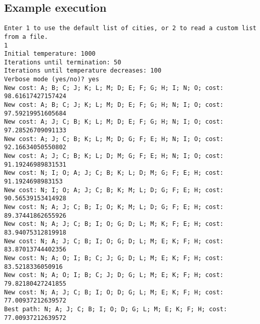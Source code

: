\documentclass[a4paper]{article}
\begin{document}
\subsection*{Example execution}
\begin{verbatim}
Enter 1 to use the default list of cities, or 2 to read a custom list from a file.
1
Initial temperature: 1000
Iterations until termination: 50
Iterations until temperature decreases: 100
Verbose mode (yes/no)? yes
New cost: A; B; C; J; K; L; M; D; E; F; G; H; I; N; O; cost: 98.61617427157424
New cost: A; B; C; J; K; L; M; D; E; F; G; H; N; I; O; cost: 97.59219951605684
New cost: A; J; C; B; K; L; M; D; E; F; G; H; N; I; O; cost: 97.28526709091133
New cost: A; J; C; B; K; L; M; D; G; F; E; H; N; I; O; cost: 92.16634050550802
New cost: A; J; C; B; K; L; D; M; G; F; E; H; N; I; O; cost: 91.19246989831531
New cost: N; I; O; A; J; C; B; K; L; D; M; G; F; E; H; cost: 91.1924698983153
New cost: N; I; O; A; J; C; B; K; M; L; D; G; F; E; H; cost: 90.56539153414928
New cost: N; A; J; C; B; I; O; K; M; L; D; G; F; E; H; cost: 89.37441862655926
New cost: N; A; J; C; B; I; O; G; D; L; M; K; F; E; H; cost: 83.94075312819918
New cost: N; A; J; C; B; I; O; G; D; L; M; E; K; F; H; cost: 83.87013744402356
New cost: N; A; O; I; B; C; J; G; D; L; M; E; K; F; H; cost: 83.5218336050916
New cost: N; A; O; I; B; C; J; D; G; L; M; E; K; F; H; cost: 79.82180427241855
New cost: N; A; J; C; B; I; O; D; G; L; M; E; K; F; H; cost: 77.00937212639572
Best path: N; A; J; C; B; I; O; D; G; L; M; E; K; F; H; cost: 77.00937212639572
\end{verbatim}
\end{document}
